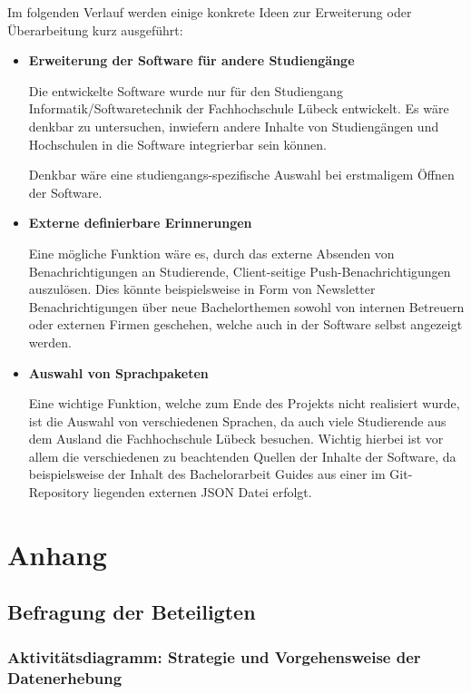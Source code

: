 \documentclass[bibliography=totoc,listof=totoc,BCOR=5mm,DIV=12,oneside]{scrbook}
\begin{document}
\par \bigskip Im folgenden Verlauf werden einige konkrete Ideen zur Erweiterung oder Überarbeitung kurz ausgeführt:

\begin{itemize}
\item \textbf{Erweiterung der Software für andere Studiengänge}
\par Die entwickelte Software wurde nur für den Studiengang Informatik/Softwaretechnik der Fachhochschule Lübeck entwickelt. Es wäre denkbar zu untersuchen, inwiefern andere Inhalte von Studiengängen und Hochschulen in die Software integrierbar sein können.
\par Denkbar wäre eine studiengangs-spezifische Auswahl bei erstmaligem Öffnen der Software.
\item \textbf{Externe definierbare Erinnerungen}
\par Eine mögliche Funktion wäre es, durch das externe Absenden von Benachrichtigungen an Studierende, Client-seitige Push-Benachrichtigungen auszulösen. Dies könnte beispielsweise in Form von Newsletter Benachrichtigungen über neue Bachelorthemen sowohl von internen Betreuern oder externen Firmen geschehen, welche auch in der Software selbst angezeigt werden.
\item \textbf{Auswahl von Sprachpaketen}
\par Eine wichtige Funktion, welche zum Ende des Projekts nicht realisiert wurde, ist die Auswahl von verschiedenen Sprachen, da auch viele Studierende aus dem Ausland die Fachhochschule Lübeck besuchen. Wichtig hierbei ist vor allem die verschiedenen zu beachtenden Quellen der Inhalte der Software, da beispielsweise der Inhalt des Bachelorarbeit Guides aus einer im Git-Repository liegenden externen JSON Datei erfolgt.
\end{itemize}

\listoftables
\listoffigures
\lstlistoflistings
\nocite{*}
\printbibliography

\newpage
\appendix
\chapter{Anhang}

\newpage
\section{Befragung der Beteiligten}

\newpage
\subsection{Aktivitätsdiagramm: Strategie und Vorgehensweise der Datenerhebung}
\label{anhang:datenerhebungStrategieAktivitätsdiagramm}
\end{document}
